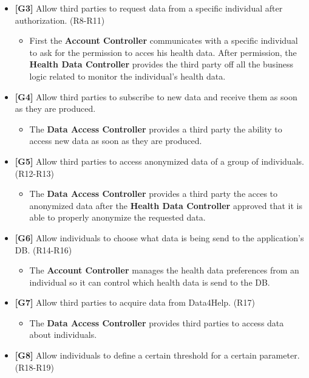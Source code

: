 \documentclass[12pt]{article}
\begin{document}
\begin{itemize}
\item \textbf{[G3]} Allow third parties to request data from a specific individual after authorization. (R8-R11)
\begin{itemize}
    \item First the \textbf{Account Controller} communicates with a specific individual to ask for the permission to acces his health data. After permission, the \textbf{Health Data Controller} provides the third party off all the business logic related to monitor the individual's health data.
\end{itemize}
\item \textbf{[G4]} Allow third parties to subscribe to new data and receive them as soon as they are produced. 
\begin{itemize}
    \item The \textbf{Data Access Controller} provides a third party the ability to access new data as soon as they are produced.
\end{itemize}
\newpage
\item \textbf{[G5]} Allow third parties to access anonymized data of a group of individuals. (R12-R13)
   \begin{itemize}
       \item The \textbf{Data Access Controller} provides a third party the acces to anonymized data after the \textbf{Health Data Controller} approved that it is able to properly anonymize the requested data.
   \end{itemize}  
 \item \textbf{[G6]} Allow individuals to choose what data is being send to the application’s DB. (R14-R16)
   \begin{itemize}
       \item The \textbf{Account Controller} manages the health data preferences from an individual so it can control which health data is send to the DB.
    \end{itemize}
 \item \textbf{[G7]} Allow third parties to acquire data from Data4Help. (R17)
       \begin{itemize}
           \item The \textbf{Data Access Controller} provides third parties to access data about individuals.
       \end{itemize}
  \item \textbf{[G8]} Allow individuals to define a certain threshold for a certain parameter. (R18-R19)
        \begin{itemize}

\end{itemize}
\end{itemize}
\end{document}
